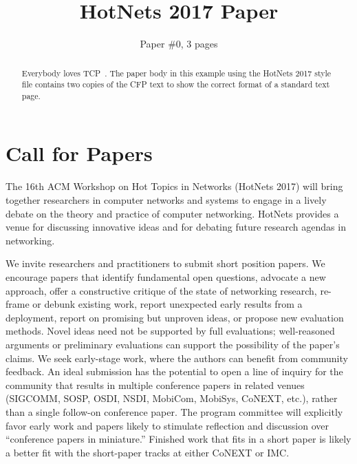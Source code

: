 \documentclass{hotnets17}
\begin{document}


\title{HotNets 2017 Paper}

\author{Paper \#0, 3 pages}

\maketitle

\begin{abstract}

Everybody loves TCP~\cite{vanjacobson}. The paper body in this example
using the HotNets 2017 style file contains two copies
of the CFP text to show the correct format of a standard text page.

\end{abstract}

\section{Call for Papers}

The 16th ACM Workshop on Hot Topics in Networks (HotNets 2017) will
bring together researchers in computer networks and systems to engage
in a lively debate on the theory and practice of computer
networking. HotNets provides a venue for discussing innovative ideas
and for debating future research agendas in networking.

We invite researchers and practitioners to submit short position
papers. We encourage papers that identify fundamental open questions,
advocate a new approach, offer a constructive critique of the state of
networking research, re-frame or debunk existing work, report
unexpected early results from a deployment, report on promising but
unproven ideas, or propose new evaluation methods. Novel ideas need
not be supported by full evaluations; well-reasoned arguments or
preliminary evaluations can support the possibility of the paper's
claims. We seek early-stage work, where the authors can benefit from
community feedback. An ideal submission has the potential to open a
line of inquiry for the community that results in multiple conference
papers in related venues (SIGCOMM, SOSP, OSDI, NSDI, MobiCom, MobiSys,
CoNEXT, etc.), rather than a single follow-on conference paper. The
program committee will explicitly favor early work and papers likely
to stimulate reflection and discussion over ``conference papers in
miniature.'' Finished work that fits in a short paper is likely a
better fit with the short-paper tracks at either CoNEXT or IMC.
\end{document}
